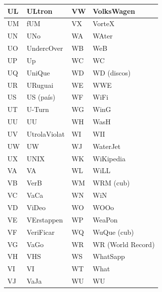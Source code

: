 \begin{table}[ht]
    \centering
    \begin{tabular}{|l|l|l|l|}
        \hline
        UL & ULtron               & VW & VolksWagen        \\ \hline
        UM & fUM                  & VX & VorteX            \\ \hline
        UN & UNo                  & WA & WAter             \\ \hline
        UO & UndercOver           & WB & WeB               \\ \hline
        UP & Up                   & WC & WC                \\ \hline
        UQ & UniQue               & WD & WD (discos)       \\ \hline
        UR & URuguai              & WE & WWE               \\ \hline
        US & US (país)            & WF & WiFi              \\ \hline
        UT & U-Turn               & WG & WinG              \\ \hline
        UU & UU                   & WH & WasH              \\ \hline
        UV & UtrolaViolat         & WI & WII               \\ \hline
        UW & UW                   & WJ & WaterJet          \\ \hline
        UX & UNIX                 & WK & WiKipedia         \\ \hline
        VA & VA                   & WL & WiLL              \\ \hline
        VB & VerB                 & WM & WRM (cub)         \\ \hline
        VC & VaCa                 & WN & WiN               \\ \hline
        VD & ViDeo                & WO & WOOo              \\ \hline
        VE & VErstappen           & WP & WeaPon            \\ \hline
        VF & VeriFicar            & WQ & WuQue (cub)       \\ \hline
        VG & VaGo                 & WR & WR (World Record) \\ \hline
        VH & VHS                  & WS & WhatSapp          \\ \hline
        VI & VI                   & WT & What              \\ \hline
        VJ & VaJa                 & WU & WU                \\ \hline

\end{tabular}
\end{table}
